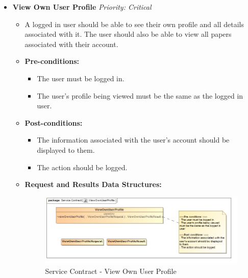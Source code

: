 \documentclass{article}
\begin{document}
\begin{itemize}
					\cleardoublepage
					\item \textbf{View Own User Profile} \hfill \textit{Priority: Critical}
					\begin{itemize}
						\item A logged in user should be able to see their own profile and all details associated with it. The user should also be able to view all papers associated with their account.
						\item \textbf{Pre-conditions:}
						\begin{itemize}
							\item The user must be logged in.
							\item The user's profile being viewed must be the same as the logged in user.
						\end{itemize}
						\item \textbf{Post-conditions:}
						\begin{itemize}
							\item The information associated with the user's account should be displayed to them.
							\item The action should be logged.
						\end{itemize}
						\item \textbf{Request and Results Data Structures:}
						\begin{figure}[H]
							\includegraphics[width=\linewidth]{../Diagrams/ServiceContracts/ViewOwnUserProfile.jpg}
							\caption{Service Contract - View Own User Profile}
						\end{figure}
					\end{itemize}
					

\end{itemize}
\end{document}
